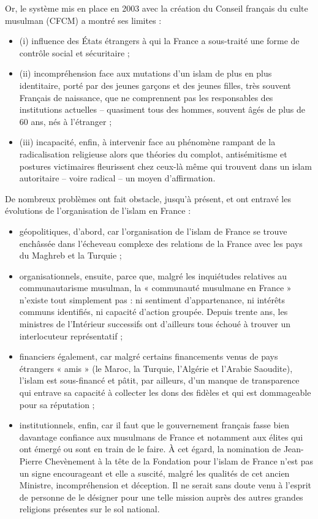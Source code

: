 Or, le système mis en place en 2003 avec la création du Conseil français
du culte musulman (CFCM) a montré ses limites :


\begin{itemize}
\item
  (i) influence des États étrangers à qui la France a sous-traité une
  forme de contrôle social et sécuritaire ;
\item
  (ii) incompréhension face aux mutations d'un islam de plus en plus
  identitaire, porté par des jeunes garçons et des jeunes filles, très
  souvent Français de naissance, que ne comprennent pas les responsables
  des institutions actuelles -- quasiment tous des hommes, souvent âgés
  de plus de 60 ans, nés à l'étranger ;
\item
  (iii) incapacité, enfin, à intervenir face au phénomène rampant de la
  radicalisation religieuse alors que théories du complot, antisémitisme
  et postures victimaires fleurissent chez ceux-là même qui trouvent
  dans un islam autoritaire -- voire radical -- un moyen d'affirmation.
\end{itemize}


De nombreux problèmes ont fait obstacle, jusqu'à présent, et ont entravé
les évolutions de l'organisation de l'islam en France :


\begin{itemize}
\item
  géopolitiques, d'abord, car l'organisation de l'islam de France se
  trouve enchâssée dans l'écheveau complexe des relations de la France
  avec les pays du Maghreb et la Turquie ;
\item
  organisationnels, ensuite, parce que, malgré les inquiétudes relatives
  au communautarisme musulman, la « communauté musulmane en France »
  n'existe tout simplement pas : ni sentiment d'appartenance, ni
  intérêts communs identifiés, ni capacité d'action groupée. Depuis
  trente ans, les ministres de l'Intérieur successifs ont d'ailleurs
  tous échoué à trouver un interlocuteur représentatif ;
\item
  financiers également, car malgré certains financements venus de pays
  étrangers « amis » (le Maroc, la Turquie, l'Algérie et l'Arabie Saoudite), l'islam est sous-financé et pâtit, par ailleurs, d'un manque de transparence qui
entrave sa capacité à collecter les dons des fidèles et qui est dommageable pour sa réputation ;
\item
  institutionnels, enfin, car il faut que le gouvernement français fasse
  bien davantage confiance aux musulmans de France et notamment aux
  élites qui ont émergé ou sont en train de le faire. À cet égard, la
  nomination de Jean-Pierre Chevènement à la tête de la Fondation pour
  l'islam de France n'est pas un signe encourageant et elle a suscité,
  malgré les qualités de cet ancien Ministre, incompréhension et
  déception. Il ne serait sans doute venu à l'esprit de personne de le
  désigner pour une telle mission auprès des autres grandes religions
  présentes sur le sol national.
\end{itemize}



